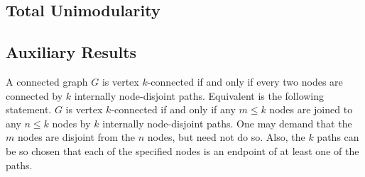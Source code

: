 \begin{definition}[$Y$-sum]
  \label{def:Y_sum}
\end{definition}


\subsection{Total Unimodularity}

\begin{definition}[TU matrix]
  \label{def:tu_matrix}
\end{definition}

\subsection{Auxiliary Results}

\begin{theorem}
  \label{thm:Menger}
  A connected graph $G$ is vertex $k$-connected if and only if every two nodes are connected by $k$ internally node-disjoint paths.
  Equivalent is the following statement. $G$ is vertex $k$-connected if and only if any $m \leq k$ nodes are joined to any $n \leq k$ nodes by $k$ internally node-disjoint paths.
  One may demand that the $m$ nodes are disjoint from the $n$ nodes, but need not do so.
  Also, the $k$ paths can be so chosen that each of the specified nodes is an endpoint of at least one of the paths.
\end{theorem}

\begin{definition}
  \label{def:Delta_Y_exchange}
\end{definition}

\begin{theorem}
  \label{census sec 3.3}
\end{theorem}

\begin{definition}[gap]
  \label{def:gap}
\end{definition}
